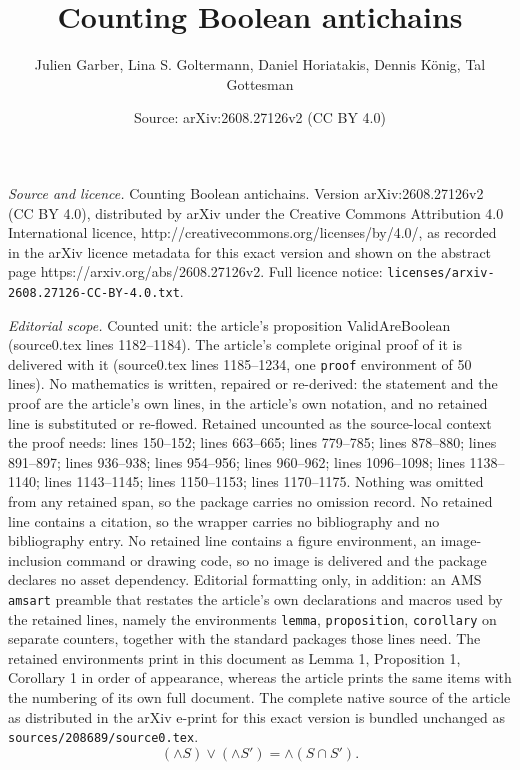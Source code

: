 \documentclass[10pt,a4paper]{amsart}
\title{Counting Boolean antichains}
\author{Julien Garber, Lina S. Goltermann, Daniel Horiatakis, Dennis K\"onig, Tal Gottesman}
\date{Source: arXiv:2608.27126v2 (CC BY 4.0)}
\begin{document}
\maketitle

\noindent\emph{Source and licence.} Counting Boolean antichains. Version arXiv:2608.27126v2 (CC BY 4.0), distributed by arXiv under the Creative Commons Attribution 4.0 International licence, http://creativecommons.org/licenses/by/4.0/, as recorded in the arXiv licence metadata for this exact version and shown on the abstract page https://arxiv.org/abs/2608.27126v2. Full licence notice: \texttt{licenses/arxiv-2608.27126-CC-BY-4.0.txt}.\par\smallskip

\noindent\textit{Editorial scope.} Counted unit: the article's proposition ValidAreBoolean (source0.tex lines 1182--1184). The article's complete original proof of it is delivered with it (source0.tex lines 1185--1234, one \texttt{proof} environment of 50 lines). No mathematics is written, repaired or re-derived: the statement and the proof are the article's own lines, in the article's own notation, and no retained line is substituted or re-flowed.  Retained uncounted as the source-local context the proof needs: lines 150--152; lines 663--665; lines 779--785; lines 878--880; lines 891--897; lines 936--938; lines 954--956; lines 960--962; lines 1096--1098; lines 1138--1140; lines 1143--1145; lines 1150--1153; lines 1170--1175.  Nothing was omitted from any retained span, so the package carries no omission record.  No retained line contains a citation, so the wrapper carries no bibliography and no bibliography entry.  No retained line contains a figure environment, an image-inclusion command or drawing code, so no image is delivered and the package declares no asset dependency.  Editorial formatting only, in addition: an AMS \texttt{amsart} preamble that restates the article's own declarations and macros used by the retained lines, namely the environments \texttt{lemma}, \texttt{proposition}, \texttt{corollary} on separate counters, together with the standard packages those lines need.  The retained environments print in this document as Lemma 1, Proposition 1, Corollary 1 in order of appearance, whereas the article prints the same items with the numbering of its own full document.  The complete native source of the article as distributed in the arXiv e-print for this exact version is bundled unchanged as \texttt{sources/208689/source0.tex}.
\begin{equation}\label{eq: intersectivity}
    (\wedge S) \vee (\wedge S') = \wedge (S\cap S').
\end{equation}
\end{document}
